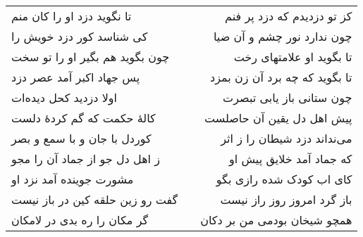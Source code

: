 \begin{center}
\begin{longtable}{l p{0.5cm} r}
تا نگوید دزد او را کان منم
&&
کز تو دزدیدم که دزد پر فنم
\\
کی شناسد کور دزد خویش را
&&
چون ندارد نور چشم و آن ضیا
\\
چون بگوید هم بگیر او را تو سخت
&&
تا بگوید او علامتهای رخت
\\
پس جهاد اکبر آمد عصر دزد
&&
تا بگوید که چه برد آن زن بمزد
\\
اولا دزدید کحل دیده‌ات
&&
چون ستانی باز یابی تبصرت
\\
کالهٔ حکمت که گم کردهٔ دلست
&&
پیش اهل دل یقین آن حاصلست
\\
کوردل با جان و با سمع و بصر
&&
می‌نداند دزد شیطان را ز اثر
\\
ز اهل دل جو از جماد آن را مجو
&&
که جماد آمد خلایق پیش او
\\
مشورت جوینده آمد نزد او
&&
کای اب کودک شده رازی بگو
\\
گفت رو زین حلقه کین در باز نیست
&&
باز گرد امروز روز راز نیست
\\
گر مکان را ره بدی در لامکان
&&
همچو شیخان بودمی من بر دکان
\\
\end{longtable}
\end{center}
